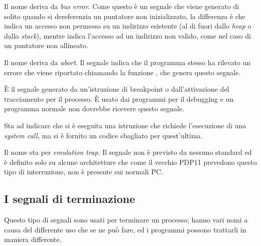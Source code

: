 \begin{basedescript}{\desclabelwidth{2.0cm}}
\item[\signald{SIGBUS}] Il nome deriva da \textit{bus error}. Come
   questo è un segnale che viene generato di solito quando si
  dereferenzia un puntatore non inizializzato, la differenza è che
   indica un accesso non permesso su un indirizzo esistente
  (al di fuori dallo \textit{heap} o dallo \textit{stack}), mentre
   indica l'accesso ad un indirizzo non valido, come nel caso
  di un puntatore non allineato.

\item[\signald{SIGABRT}] Il nome deriva da \textit{abort}. Il segnale indica
  che il programma stesso ha rilevato un errore che viene riportato chiamando
  la funzione , che genera questo segnale.

\item[\signald{SIGTRAP}] È il segnale generato da un'istruzione di breakpoint o
  dall'attivazione del tracciamento per il processo. È usato dai programmi per
  il debugging e un programma normale non dovrebbe ricevere questo segnale.

\item[\signald{SIGSYS}] Sta ad indicare che si è eseguita una istruzione che
  richiede l'esecuzione di una \textit{system call}, ma si è fornito un codice
  sbagliato per quest'ultima. 

\item[\signald{SIGEMT}] Il nome sta per \textit{emulation trap}. Il segnale non
  è previsto da nessuno standard ed è definito solo su alcune architetture che
  come il vecchio PDP11 prevedono questo tipo di interruzione, non è presente
  sui normali PC.
\end{basedescript}


\subsection{I segnali di terminazione}
\label{sec:sig_termination}

Questo tipo di segnali sono usati per terminare un processo; hanno vari nomi a
causa del differente uso che se ne può fare, ed i programmi possono
trattarli in maniera differente. 

